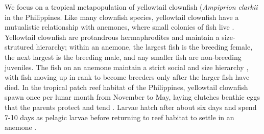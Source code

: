 \documentclass[12pt, oneside]{article}   	%
\begin{document}






We focus on a tropical metapopulation of yellowtail clownfish (\textit{Ampiprion clarkii} in the Philippines. Like many clownfish species, yellowtail clownfish have a mutualistic relationship with anemones, where small colonies of fish live \citep{buston2003social, fautin1992field}. Yellowtail clownfish are protandrous hermaphrodites and maintain a size-strutured hierarchy; within an anemone, the largest fish is the breeding female, the next largest is the breeding male, and any smaller fish are non-breeding juveniles. The fish on an anemone maintain a strict social and size hierarchy \citep{buston2003social}, with fish moving up in rank to become breeders only after the larger fish have died. In the tropical patch reef habitat of the Philippines, yellowtail clownfish spawn once per lunar month from November to May, laying clutches benthic eggs that the parents protect and tend \citep{ochi1989mating}. Larvae hatch after about six days and spend 7-10 days as pelagic larvae before returning to reef habitat to settle in an anemone \citep{fautin1992field}.


\end{document}

